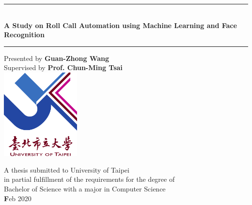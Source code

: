 \def\title{A Study on Roll Call Automation using Machine Learning and Face Recognition}
\def\author{Guan-Zhong Wang}
\def\supervisor{Prof. Chun-Ming Tsai}
\def\date{Feb 2020}

\begin{titlepage}
  \begin{center}
    \vspace*{1cm}

    \rule{16cm}{1.5pt}\\
    \vspace*{0.5cm}
    \textbf{\huge \title}
    \vspace*{0.5cm}
    \noindent\rule{16cm}{1.5pt}
    \vspace{0.5cm}

    {\large Presented by} \textbf{\Large \author}\\
    \vspace{0.3cm}
    {\large Supervised by} \textbf{\Large \supervisor}\\

    \vspace{2.0cm}
    \includegraphics[width=0.3\textwidth]{figures/utaipei.png}
    \vspace{1.5cm}

    \vfill

    {\Large A thesis submitted to University of Taipei\\
      in partial fulfillment of the requirements for the degree of\\
      Bachelor of Science with a major in Computer Science\\
    }
    \vspace{1.2cm}
    {\Large \textbf\date}

    \vspace{3.5cm}

  \end{center}
\end{titlepage}
